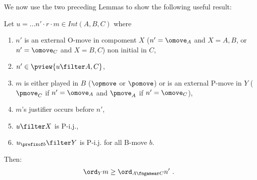 We now use the two preceding Lemmas to show
the following useful result:
\begin{lemma}
\label{lem:increasing_order}
Let $u = \ldots n' \cdot r \cdot m \in Int(A,B,C)$ where
\begin{enumerate}
\item
$n'$ is an external O-move in compoment $X$
($n'=\omove_A$ and $X=A,B$, or $n'=\omove_C$ and $X=B,C$)  non initial in $C$,
\item $n' \in \pview{u\filter A,C}$,
\item $m$ is either played in $B$
($\opmove$ or $\pomove$) or is an external
 P-move in $Y$
($\pmove_C$ if $n'=\omove_A$ and
$\pmove_A$ if $n'=\omove_C$),
\item $m$'s justifier occurs before $n'$,
\item $u\filter X$ is P-i.j.,
\item $u_{\prefixof b}\filter Y$ is P-i.j. for all B-move $b$.
\end{enumerate}
Then:
$$ \ord_{Y} m \geq \ord_{A\fngamear C} n' \ .$$
\end{lemma}
